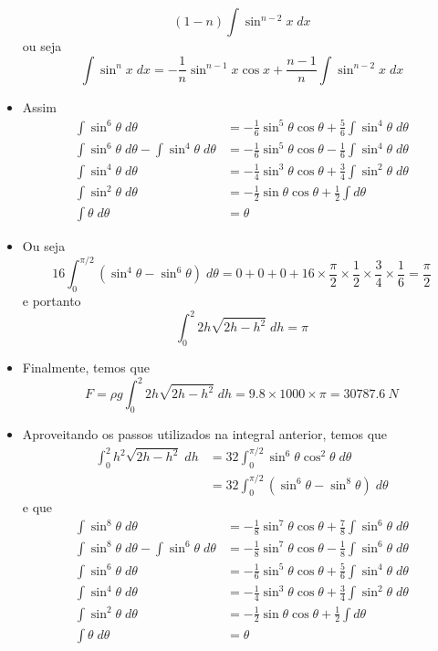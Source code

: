 \documentclass[brazilian,11pt]{article}
\begin{document}
\begin{itemize}
\[            (1-n)\int\sin^{n-2} x\; dx
        \]
        ou seja
        \[
            \int \sin^n x\; dx = -\frac{1}{n} \sin^{n-1} x\cos x+
            \frac{n-1}{n}\int\sin^{n-2} x\; dx
        \]
    \item Assim
        \begin{align*}
            \int \sin^6\theta\; d\theta&=
            -\frac{1}{6}\sin^5 \theta\cos\theta+
            \frac{5}{6}\int\sin^4 \theta\; d\theta \\
            \int\sin^6\theta\; d\theta-\int\sin^4\theta\;d\theta&=
            -\frac{1}{6}\sin^5 \theta\cos\theta-
            \frac{1}{6}\int\sin^4 \theta\; d\theta \\
            \int\sin^4\theta\; d\theta&=-\frac{1}{4}\sin^3\theta\cos\theta+
            \frac{3}{4}\int\sin^2\theta\;d\theta \\
            \int\sin^2\theta\;d\theta &=-\frac{1}{2}\sin\theta\cos\theta+
            \frac{1}{2}\int d\theta \\
            \int\theta\; d\theta &= \theta
        \end{align*}
    \item Ou seja
        \[
            16\int_0^{\pi/2}(\sin^4\theta-\sin^6\theta)\; d\theta =
            0+0+0+16\times\frac{\pi}{2}\times\frac{1}{2}\times\frac{3}{4}\times\frac{1}{6}=
            \frac{\pi}{2}
        \]
        e portanto
        \[
            \int_0^2 2h\sqrt{2h-h^2}\; dh = \pi
        \]
    \item Finalmente, temos que
        \[
            F=\rho g 
            \int_0^2 2h\sqrt{2h-h^2}\; dh = 
            9.8 \times 1000 \times \pi = \SI{30787.6}{N}
        \]
    \item Aproveitando os passos utilizados na integral anterior, temos que
        \[
            \begin{split}
                \int_0^{2} h^2\sqrt{2h-h^2}\; dh &=
                32\int_0^{\pi/2}\sin^6\theta\cos^2\theta\;d\theta \\
                &= 32\int_0^{\pi/2}(\sin^6\theta-\sin^8\theta)\; d\theta
            \end{split}
        \]
        e que
        \begin{align*}
            \int \sin^8\theta\; d\theta&=
            -\frac{1}{8}\sin^7 \theta\cos\theta+
            \frac{7}{8}\int\sin^6 \theta\; d\theta \\
            \int\sin^8\theta\; d\theta-\int\sin^6\theta\;d\theta&=
            -\frac{1}{8}\sin^7 \theta\cos\theta-
            \frac{1}{8}\int\sin^6 \theta\; d\theta \\
            \int \sin^6\theta\; d\theta&=
            -\frac{1}{6}\sin^5 \theta\cos\theta+
            \frac{5}{6}\int\sin^4 \theta\; d\theta \\
            \int\sin^4\theta\; d\theta&=-\frac{1}{4}\sin^3\theta\cos\theta+
            \frac{3}{4}\int\sin^2\theta\;d\theta \\
            \int\sin^2\theta\;d\theta &=-\frac{1}{2}\sin\theta\cos\theta+
            \frac{1}{2}\int d\theta \\
            \int\theta\; d\theta &= \theta
        \end{align*}


\end{itemize}
\end{document}
